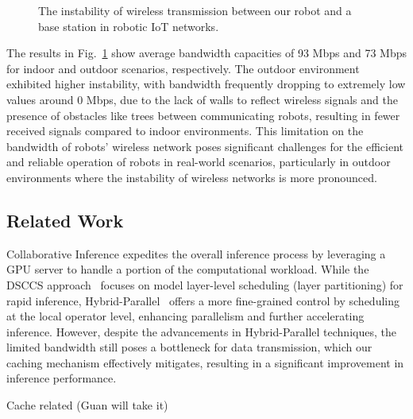 \begin{figure}[htp]
    \centering
    \hfil
    \caption{The instability of wireless transmission between our robot and a base station in robotic IoT networks.}
    \label{fig:bandwidth} 
\end{figure}


The results in Fig.~\ref{fig:bandwidth} show average bandwidth capacities of 93 Mbps and 73 Mbps for indoor and outdoor scenarios, respectively. 
The outdoor environment exhibited higher instability, with bandwidth frequently dropping to extremely low values around 0 Mbps, due to the lack of walls to reflect wireless signals and the presence of obstacles like trees between communicating robots, resulting in fewer received signals compared to indoor environments. This limitation on the bandwidth of robots' wireless network poses significant challenges for the efficient and reliable operation of robots in real-world scenarios, particularly in outdoor environments where the instability of wireless networks is more pronounced.

\subsection{Related Work}
Collaborative Inference expedites the overall inference process by leveraging a GPU server to handle a portion of the computational workload. 
While the DSCCS approach~\cite{liang2023dnn} focuses on model layer-level scheduling (layer partitioning) for rapid inference, Hybrid-Parallel~\cite{sun2024hybridparallel} offers a more fine-grained control by scheduling at the local operator level, enhancing parallelism and further accelerating inference. 
However, despite the advancements in Hybrid-Parallel techniques, the limited bandwidth still poses a bottleneck for data transmission, which our caching mechanism effectively mitigates, resulting in a significant improvement in inference performance.

Cache related (Guan will take it)